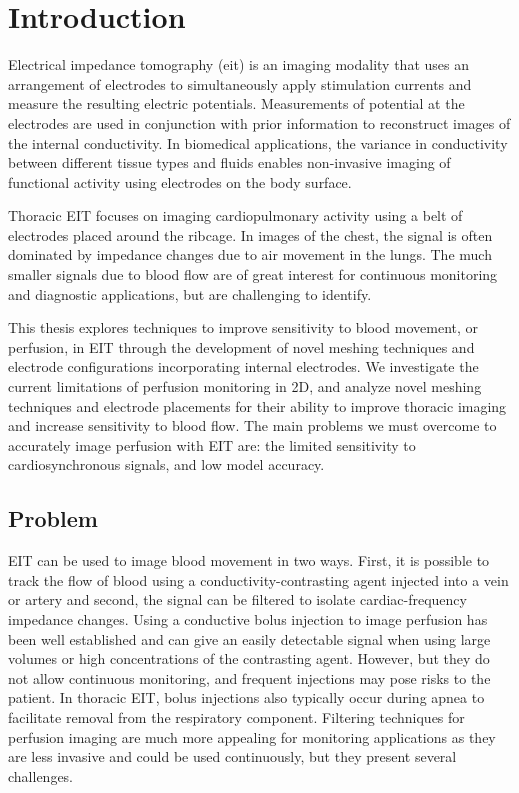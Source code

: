 \chapter{Introduction}

Electrical impedance tomography (\acrshort{eit}) is an imaging modality that uses an arrangement 
of electrodes to simultaneously apply 
stimulation currents and measure 
the resulting electric potentials. Measurements of potential at the 
electrodes are used in conjunction with 
prior information to reconstruct images 
of the internal conductivity. In biomedical applications, 
the variance in conductivity between different 
tissue types and fluids enables non-invasive 
imaging of functional activity using electrodes on the 
body surface. 

Thoracic EIT focuses on imaging cardiopulmonary activity
using a belt of electrodes placed around the ribcage.
In images of the chest, the signal is often dominated by 
impedance changes due to air movement in the lungs. 
The much smaller signals due to blood flow are of great interest for 
continuous monitoring and diagnostic applications,
but are challenging to identify. 

This thesis explores techniques to improve sensitivity to blood movement, or perfusion,  
in EIT through the development of novel meshing techniques and electrode configurations
incorporating internal electrodes. 
We investigate the current limitations of perfusion monitoring in 2D, and
analyze novel meshing techniques and electrode placements for their 
ability to improve thoracic imaging and increase sensitivity to blood flow. 
The main problems we must overcome to accurately 
image perfusion with EIT are: the limited sensitivity 
to cardiosynchronous signals, and low model accuracy.

\section{Problem}

EIT can be used to image blood movement in two ways. 
First, it is possible to track the flow of blood using a 
conductivity-contrasting agent injected into a vein or artery
and second, the signal can be filtered to isolate cardiac-frequency 
impedance changes. 
Using a conductive bolus injection to image perfusion has been well established and 
can give an easily detectable signal when using large volumes
or high concentrations of the contrasting agent. However, but they do not 
allow continuous monitoring, and frequent injections may pose 
risks to the patient.
In thoracic EIT, bolus injections also typically occur during apnea to 
facilitate removal from the respiratory component.
Filtering techniques for perfusion imaging are much more appealing for 
monitoring applications as they are less invasive 
and could be used continuously, but they present several challenges. 

